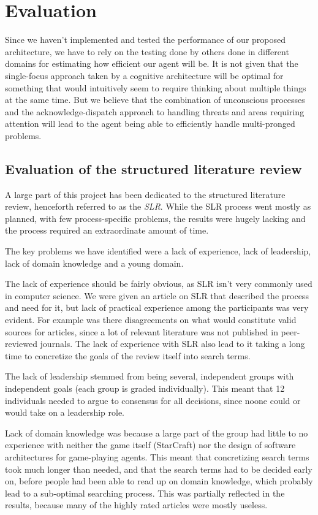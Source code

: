 \section{Evaluation}
Since we haven't implemented and tested the performance of our proposed
architecture, we have to rely on the testing done by others done in different
domains for estimating how efficient our agent will be. It is not given that the
single-focus approach taken by a cognitive architecture will be optimal for
something that would intuitively seem to require thinking about multiple things
at the same time. But we believe that the combination of unconscious processes
and the acknowledge-dispatch approach to handling threats and areas requiring
attention will lead to the agent being able to efficiently handle multi-pronged
problems.

\subsection{Evaluation of the structured literature review}
A large part of this project has been dedicated to the structured literature
review, henceforth referred to as the \textit{SLR}. While the SLR process went
mostly as planned, with few process-specific problems, the results were hugely
lacking and the process required an extraordinate amount of time.

The key problems we have identified were a lack of experience, lack of
leadership, lack of domain knowledge and a young domain.

The lack of experience should be fairly obvious, as SLR isn't very commonly
used in computer science. We were given an article on SLR that described the
process and need for it, but lack of practical experience among the
participants was very evident. For example was there disagreements on what
would constitute valid sources for articles, since a lot of relevant literature
was not published in peer-reviewed journals. The lack of
experience with SLR also lead to it taking a long time to concretize the goals
of the review itself into search terms.

The lack of leadership stemmed from being several, independent groups with
independent goals (each group is graded individually). This meant that 12
individuals needed to argue to consensus for all decisions, since noone could
or would take on a leadership role.

Lack of domain knowledge was because a large part of the group had little to no
experience with neither the game itself (StarCraft) nor the design of software
architectures for game-playing agents. This meant that concretizing search
terms took much longer than needed, and that the search terms had to be
decided early on, before people had been able to read up on domain knowledge,
which probably lead to a sub-optimal searching process. This was partially
reflected in the results, because many of the highly rated articles were mostly
useless.


